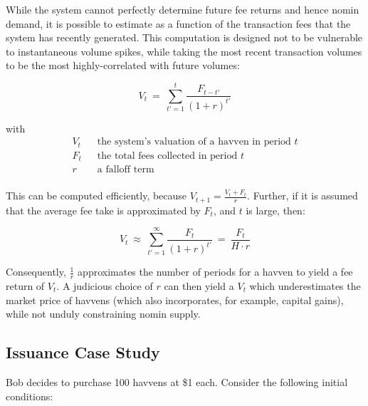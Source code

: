 \noindent While the system cannot perfectly determine future fee returns and hence nomin demand, it is possible to estimate as a
function of the transaction fees that the system has recently generated.
This computation is designed not to be vulnerable to instantaneous volume spikes, while taking the most recent transaction
volumes to be the most highly-correlated with future volumes:

\vspace{3mm}

\begin{equation}
    V_{t} \ = \ \sum_{t'=1}^{t} \frac{F_{t - t'}}{(1 + r)^{t'}} \label{eq:price}
\end{equation}

with
\begin{align*} 
V_{t} \ \ & \text{ the system's valuation of a havven in period } t  \\
F_t \ \ & \text{ the total fees collected in period } t\\
r \ \ & \text{ a falloff term}  \\
\end{align*}

\noindent This can be computed efficiently, because $V_{t+1} = \frac{V_t + F_t}{r}$. 
Further, if it is assumed that the average fee take is approximated by $F_t$, and $t$ is large, then:

\vspace{2mm}

\begin{equation}
    V_t \ \approx \ \sum_{t'=1}^{\infty} \frac{F_t}{(1 + r)^{t'}} \ = \ \frac{F_t}{H \cdot r}
\end{equation}

\vspace{3mm}

\noindent Consequently, $\frac{1}{r}$ approximates the number of periods for a havven to yield a fee return of $V_t$.
A judicious choice of $r$ can then yield a $V_t$ which underestimates the market price of havvens (which also incorporates,
for example, capital gains), while not unduly constraining nomin supply.

\newpage

\subsection{Issuance Case Study} 

\noindent Bob decides to purchase 100 havvens at \$1 each. Consider the following initial conditions:

